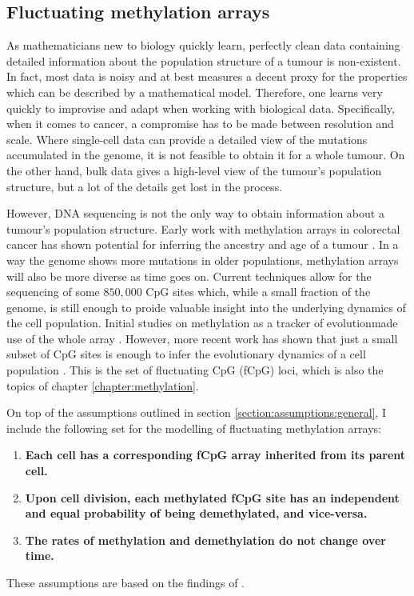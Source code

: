 \subsection{Fluctuating methylation arrays}
As mathematicians new to biology quickly learn, perfectly clean data containing detailed information
about the population structure of a tumour is non-existent. In fact, most data is noisy and at best measures
a decent proxy for the properties which can be described by a mathematical model.
Therefore, one learns very quickly to improvise and adapt when working with biological data. Specifically, when it comes to
cancer, a compromise has to be made between resolution and scale. Where single-cell data can provide a detailed view of the
mutations accumulated in the genome, it is not feasible to obtain it for a whole tumour. On the other hand, bulk data
gives a high-level view of the tumour's population structure, but a lot of the details get lost in the process. \par
However, DNA sequencing is not the only way to obtain information about a tumour's population structure. Early work with
methylation arrays in colorectal cancer has shown potential for inferring the ancestry and age of a tumour \cite{hong_using_2010,
siegmund_high_2011}. In a way the genome shows more mutations in older populations, methylation arrays will also be more diverse
as time goes on. Current techniques allow for the sequencing of some $850,000$ CpG sites which, while a small fraction of the
genome, is still enough to proide valuable insight into the underlying dynamics of the cell population. Initial studies on
methylation as a tracker of evolutionmade use of the whole array \cite{siegmund_modeling_2008, sottoriva_integrating_2010}.
However, more recent work has shown that just a small subset of CpG sites is enough to infer the evolutionary dynamics of a
cell population \cite{gabbutt_fluctuating_2022, gabbutt_evolutionary_2023}. This is the set of fluctuating CpG (fCpG) loci,
which is also the topics of chapter \ref{chapter:methylation}. \par
On top of the assumptions outlined in section \ref{section:assumptions:general}, I include the following set for the modelling
of fluctuating methylation arrays:
\begin{enumerate}[(i')]
    \item \textbf{Each cell has a corresponding fCpG array inherited from its parent cell.}
    \item \textbf{Upon cell division, each methylated fCpG site has an independent and equal probability of being demethylated,
        and vice-versa.}
    \item \textbf{The rates of methylation and demethylation do not change over time.}
\end{enumerate}
These assumptions are based on the findings of \cite{gabbutt_fluctuating_2022, gabbutt_evolutionary_2023}.

